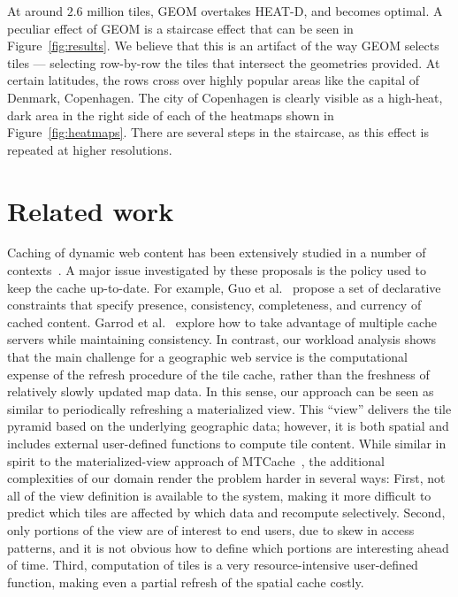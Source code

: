 \documentclass[11pt, oneside]{report}
\begin{document}
At around $2.6$ million tiles, GEOM overtakes HEAT-D, and becomes optimal. A peculiar effect of GEOM is a staircase effect that can be seen in Figure~\ref{fig:results}. We believe that this is an artifact of the way GEOM selects tiles --- selecting row-by-row the tiles that intersect the geometries provided. At certain latitudes, the rows cross over highly popular areas like the capital of Denmark, Copenhagen. The city of Copenhagen is clearly visible as a high-heat, dark area in the right side of each of the heatmaps shown in Figure~\ref{fig:heatmaps}. There are several steps in the staircase, as this effect is repeated at higher resolutions.

\section{Related work}
\label{sec:tileheat:related:work}

Caching of dynamic web content has been extensively studied in a number of contexts~\cite{DDT+01:DynamicContentAcceleration,GMA+08:Ferdinand,GLR05:GoodEnough,LGZ04:MTCache,LKM+02:DBCache,Moh01:WebCaching}. A major issue investigated by these proposals is the policy used to keep the cache up-to-date. 
For example, Guo et al.~\cite{GLR05:GoodEnough} propose a set of declarative constraints that specify presence,  consistency, completeness, and currency of cached content. 
Garrod et al.~\cite{GMA+08:Ferdinand} explore how to take advantage of multiple cache servers while maintaining consistency. In contrast, our workload analysis shows that the main challenge for a geographic web service is the computational expense of the refresh procedure of the tile cache, rather than the freshness of relatively slowly updated map data. In this sense, our approach can be seen as similar to periodically refreshing a materialized view. This  ``view'' delivers the tile pyramid based on the underlying geographic data; however, it is both spatial and includes external user-defined functions to compute tile content. While similar in spirit to the materialized-view approach of MTCache~\cite{LGZ04:MTCache}, the additional complexities of our domain render the problem harder in several ways: First, not all of the view definition is available to the system, making it more difficult to predict which tiles are affected by which data and recompute selectively. Second, only portions of the view are of interest to end users, due to skew in access patterns, and it is not obvious how to define which portions are interesting ahead of time. Third, computation of tiles is a very resource-intensive user-defined function, making even a partial refresh of the spatial cache costly.  
 
\end{document}
